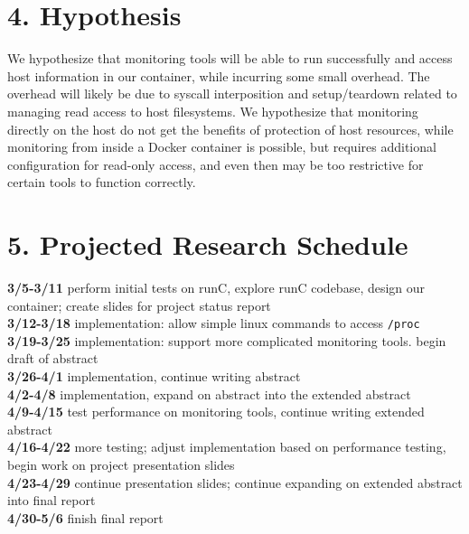 \documentclass{proc}
\begin{document}
\section*{4. Hypothesis}

We hypothesize that monitoring tools will be able to run successfully and access host information in our container, while incurring some small overhead. The overhead will likely be due to syscall interposition and setup/teardown related to managing read access to host filesystems. We hypothesize that monitoring directly on the host do not get the benefits of protection of host resources, while monitoring from inside a Docker container is possible, but requires additional configuration for read-only access, and even then may be too restrictive for certain tools to function correctly.

\section*{5. Projected Research Schedule}

\textbf{3/5-3/11} perform initial tests on runC, explore runC codebase, design our container; create slides for project status report\\
\textbf{3/12-3/18} implementation: allow simple linux commands to access \texttt{/proc}\\
\textbf{3/19-3/25} implementation: support more complicated monitoring tools. begin draft of abstract\\
\textbf{3/26-4/1} implementation, continue writing abstract\\
\textbf{4/2-4/8} implementation, expand on abstract into the extended abstract\\
\textbf{4/9-4/15} test performance on monitoring tools, continue writing extended abstract\\
\textbf{4/16-4/22} more testing; adjust implementation based on performance testing, begin work on project presentation slides\\
\textbf{4/23-4/29} continue presentation slides; continue expanding on extended abstract into final report\\
\textbf{4/30-5/6} finish final report



\end{document}

